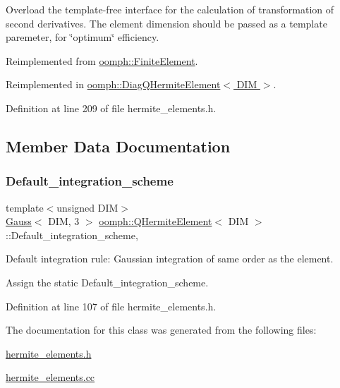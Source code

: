 Overload the template-\/free interface for the calculation of transformation of second derivatives. The element dimension should be passed as a template paremeter, for \char`\"{}optimum\char`\"{} efficiency. 



Reimplemented from \hyperlink{classoomph_1_1FiniteElement_ab2c61e830b834bbd1159c679b1c093ba}{oomph\+::\+Finite\+Element}.



Reimplemented in \hyperlink{classoomph_1_1DiagQHermiteElement_a6d6dbf192bc9284a87608e2699f8ebb1}{oomph\+::\+Diag\+Q\+Hermite\+Element$<$ D\+I\+M $>$}.



Definition at line 209 of file hermite\+\_\+elements.\+h.



\subsection{Member Data Documentation}
\mbox{\label{classoomph_1_1QHermiteElement_a51a474fe0cd5c8986bd68a94a0e369b7}} 
\subsubsection{\texorpdfstring{Default\+\_\+integration\+\_\+scheme}{Default\_integration\_scheme}}
{\footnotesize\ttfamily template$<$unsigned D\+IM$>$ \\
\hyperlink{classoomph_1_1Gauss}{Gauss}$<$ D\+IM, 3 $>$ \hyperlink{classoomph_1_1QHermiteElement}{oomph\+::\+Q\+Hermite\+Element}$<$ D\+IM $>$\+::Default\+\_\+integration\+\_\+scheme\hspace{0.3cm}{\ttfamily [static]}, {\ttfamily [private]}}



Default integration rule\+: Gaussian integration of same \textquotesingle{}order\textquotesingle{} as the element. 

Assign the static Default\+\_\+integration\+\_\+scheme. 

Definition at line 107 of file hermite\+\_\+elements.\+h.



The documentation for this class was generated from the following files\+:\begin{DoxyCompactItemize}
\item 
\hyperlink{hermite__elements_8h}{hermite\+\_\+elements.\+h}\item 
\hyperlink{hermite__elements_8cc}{hermite\+\_\+elements.\+cc}\end{DoxyCompactItemize}
